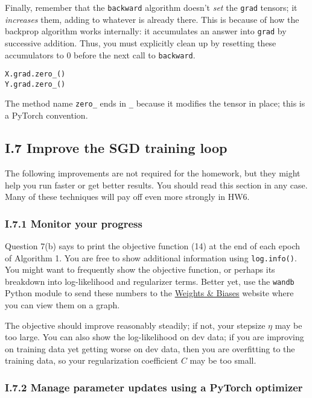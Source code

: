 Finally, remember that the \texttt{backward} algorithm doesn’t \textit{set} the \texttt{grad} tensors; it \textit{increases} them, adding to whatever is already there. This is because of how the backprop algorithm works internally: it accumulates an answer into \texttt{grad} by successive addition. Thus, you must explicitly clean up by resetting these accumulators to 0 before the next call to \texttt{backward}.
\begin{verbatim}
X.grad.zero_()
Y.grad.zero_()
\end{verbatim}

The method name \texttt{zero\_} ends in \texttt{\_} because it modifies the tensor in place; this is a PyTorch convention.

\subsection*{I.7 Improve the SGD training loop}

The following improvements are not required for the homework, but they might help you run faster or get better results. You should read this section in any case. Many of these techniques will pay off even more strongly in HW6.

\subsubsection*{I.7.1 Monitor your progress}

Question 7(b) says to print the objective function (14) at the end of each epoch of Algorithm 1. You are free to show additional information using \texttt{log.info()}. You might want to frequently show the objective function, or perhaps its breakdown into log-likelihood and regularizer terms. Better yet, use the \texttt{wandb} Python module to send these numbers to the \href{https://wandb.ai}{Weights \& Biases} website where you can view them on a graph.

The objective should improve reasonably steadily; if not, your stepsize $\eta$ may be too large. You can also show the log-likelihood on dev data; if you are improving on training data yet getting worse on dev data, then you are overfitting to the training data, so your regularization coefficient $C$ may be too small.

\subsubsection*{I.7.2 Manage parameter updates using a PyTorch optimizer}


